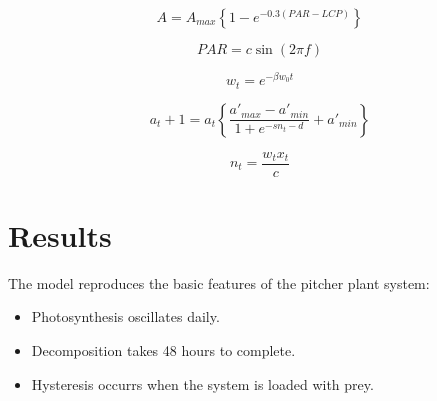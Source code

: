 \documentclass[a0,landscape]{a0poster}
\begin{document}
\begin{multicols}{4}
\begin{equation}
  A = A_{max} \left\{ 1 - e^{-0.3 (PAR - LCP)} \right\} 
  \label{eqn:photosynthesis}
\end{equation}

\begin{equation}
PAR = c \sin(2 \pi f)
\label{eqn:PAR}
\end{equation}

\begin{equation}
w_t = e^{-\beta w_0 t}
\label{eqn:decomp}
\end{equation}

\begin{equation}
a_t+1 = a_t \left\{ \frac{a'_{max}-a'_{min}}{1+e^{-s n_t - d}} + a'_{min}\right\}
\label{eqn:oxygenation}
\end{equation}

\begin{equation}
n_t = \frac{w_t x_t}{c}
\label{eqn:nutrients}
\end{equation}









\section*{Results}
The model reproduces the basic features of the pitcher plant system:

\begin{itemize}
\item Photosynthesis oscillates daily.
\item Decomposition takes 48 hours to complete.
\item Hysteresis occurrs when the system is loaded with prey. 
\end{itemize}



\end{multicols}
\end{document}

